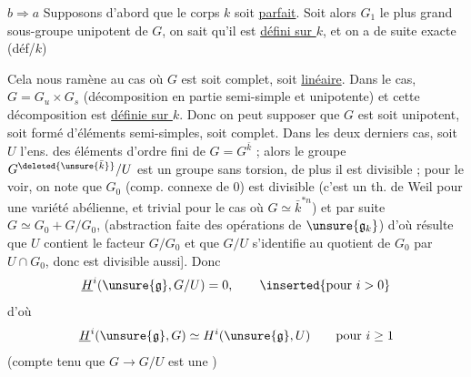 $b\Rightarrow a$ 
Supposons d'abord que le corps  $k$ soit \uline{parfait}.
Soit alors $G_1$ le plus grand sous-groupe unipotent de $G$, on sait qu'il est \uline{défini sur $k$}, et on a de suite exacte
(déf/$k$)



Cela nous ramène au cas où $G$ est soit complet, soit \uline{linéaire}. Dans le   cas,  $G=G_u\times G_s$ (décomposition en partie semi-simple et unipotente) et cette décomposition est \uline{définie sur $k$}.
Donc on peut supposer que $G$ est soit unipotent, soit  formé d'éléments semi-simples, soit complet.
Dans les deux derniers cas, soit $U$ l'ens. des éléments d'ordre fini de $G=G^{\bar k}$ ; alors le groupe $G^{\deleted{\unsure{\bar k}}}/U$ est un groupe sans torsion, de plus il est divisible ; pour le voir, on note que $G_0$ (comp. connexe de $0$) est divisible (c'est un th. de Weil pour une variété abélienne, et  trivial pour le cas où $G\simeq\bar k^{*n}$) et  par suite $G\simeq G_0+G/G_0$,  (abstraction faite des opérations de $\unsure{\mathfrak g_k}$) d'où résulte que $U$ contient le facteur $G/G_0$ et que $G/U$ s'identifie au quotient de $G_0$ par $U\cap G_0$, donc est divisible aussi].
Donc 
\[
\underline H^i(\unsure{\mathfrak g},G/U)=0,\qquad\inserted{\text{pour }i>0}
\]
 d'où
\[
\underline H^i(\unsure{\mathfrak g},G)\simeq H^i(\unsure{\mathfrak g},U)\qquad\text{pour }i\geq1
\]
(compte tenu que $G\longrightarrow G/U$ est une )

